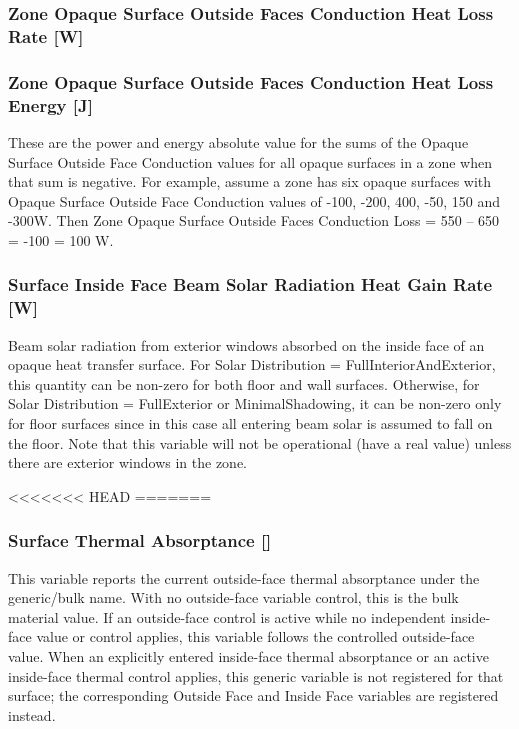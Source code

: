 \subsubsection{Zone Opaque Surface Outside Faces Conduction Heat Loss Rate {[}W{]}}\label{zone-opaque-surface-outside-face-conduction-loss-w}

\subsubsection{Zone Opaque Surface Outside Faces Conduction Heat Loss Energy {[}J{]}}\label{zone-opaque-surface-outside-face-conduction-loss-energy-j}

These are the power and energy absolute value for the sums of the Opaque Surface Outside Face Conduction values for all opaque surfaces in a zone when that sum is negative. For example, assume a zone has six opaque surfaces with Opaque Surface Outside Face Conduction values of -100, -200, 400, -50, 150 and -300W. Then Zone Opaque Surface Outside Faces Conduction Loss = \textbar{}550 -- 650\textbar{} = \textbar{}-100\textbar{} = 100 W.

\subsubsection{Surface Inside Face Beam Solar Radiation Heat Gain Rate {[}W{]}}\label{surface-inside-face-beam-solar-radiation-heat-gain-rate-w}

Beam solar radiation from exterior windows absorbed on the inside face of an opaque heat transfer surface. For Solar Distribution = FullInteriorAndExterior, this quantity can be non-zero for both floor and wall surfaces. Otherwise, for Solar Distribution = FullExterior or MinimalShadowing, it can be non-zero only for floor surfaces since in this case all entering beam solar is assumed to fall on the floor. Note that this variable will not be operational (have a real value) unless there are exterior windows in the zone.

<<<<<<< HEAD
=======
\subsubsection{Surface Thermal Absorptance {[}{]}}\label{surface-thermal-absorptance}

This variable reports the current outside-face thermal absorptance under the generic/bulk name. With no outside-face variable control, this is the bulk material value. If an outside-face control is active while no independent inside-face value or control applies, this variable follows the controlled outside-face value. When an explicitly entered inside-face thermal absorptance or an active inside-face thermal control applies, this generic variable is not registered for that surface; the corresponding Outside Face and Inside Face variables are registered instead.


